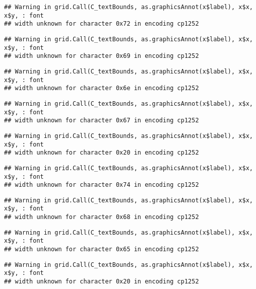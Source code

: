 \documentclass[
]{article}
\begin{document}
\begin{verbatim}
## Warning in grid.Call(C_textBounds, as.graphicsAnnot(x$label), x$x, x$y, : font
## width unknown for character 0x72 in encoding cp1252
\end{verbatim}

\begin{verbatim}
## Warning in grid.Call(C_textBounds, as.graphicsAnnot(x$label), x$x, x$y, : font
## width unknown for character 0x69 in encoding cp1252
\end{verbatim}

\begin{verbatim}
## Warning in grid.Call(C_textBounds, as.graphicsAnnot(x$label), x$x, x$y, : font
## width unknown for character 0x6e in encoding cp1252
\end{verbatim}

\begin{verbatim}
## Warning in grid.Call(C_textBounds, as.graphicsAnnot(x$label), x$x, x$y, : font
## width unknown for character 0x67 in encoding cp1252
\end{verbatim}

\begin{verbatim}
## Warning in grid.Call(C_textBounds, as.graphicsAnnot(x$label), x$x, x$y, : font
## width unknown for character 0x20 in encoding cp1252
\end{verbatim}

\begin{verbatim}
## Warning in grid.Call(C_textBounds, as.graphicsAnnot(x$label), x$x, x$y, : font
## width unknown for character 0x74 in encoding cp1252
\end{verbatim}

\begin{verbatim}
## Warning in grid.Call(C_textBounds, as.graphicsAnnot(x$label), x$x, x$y, : font
## width unknown for character 0x68 in encoding cp1252
\end{verbatim}

\begin{verbatim}
## Warning in grid.Call(C_textBounds, as.graphicsAnnot(x$label), x$x, x$y, : font
## width unknown for character 0x65 in encoding cp1252
\end{verbatim}

\begin{verbatim}
## Warning in grid.Call(C_textBounds, as.graphicsAnnot(x$label), x$x, x$y, : font
## width unknown for character 0x20 in encoding cp1252
\end{verbatim}
\end{document}
